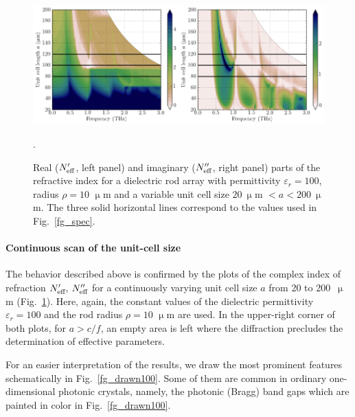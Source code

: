 \begin{figure}\centering  %
\includegraphics[width=0.5\textwidth]{img/ERods_eps100_spacingscan_Nim.pdf}\includegraphics[width=0.5\textwidth]{img/ERods_eps100_spacingscan_Nre.pdf}
\caption{Real ($N_{\text{eff} }'$, left panel) and imaginary ($N_{\text{eff} }''$, right panel) parts of the refractive index for a dielectric rod array with permittivity $\varepsilon_r =100$, radius $\rho = 10$ $\upmu$m and a variable unit cell size $20\:\upmu$m $<a<200\:\upmu$m.  The three solid horizontal lines correspond to the values used in Fig.~\ref{fg_spec}.}
\label{fg_spacingscan100}. 
\end{figure}

\paragraph{Continuous scan of the unit-cell size}%
The behavior described above is confirmed by the plots of the complex index of refraction $N_{\text{eff} }',\: N_{\text{eff} }''$ for a continuously varying unit cell size $a$ from 20 to 200~$\upmu$m (Fig.~\ref{fg_spacingscan100}). Here, again, the constant values of the dielectric permittivity $\varepsilon_r=100$ and the rod radius $\rho=10$ $\upmu$m are used. In the upper-right corner of both plots, for $a>c/f$, an empty area is left where the diffraction precludes the determination of effective parameters. 

For an easier interpretation of the results, we draw the most prominent features schematically in Fig.~\ref{fg_drawn100}. Some of them are common in ordinary one-dimensional photonic crystals, namely, the photonic (Bragg) band gaps which are painted in color in Fig.~\ref{fg_drawn100}.

